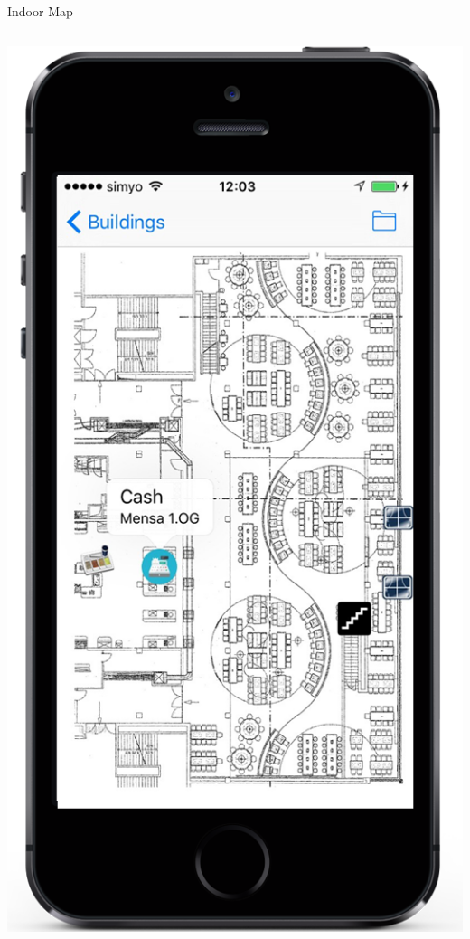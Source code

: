 \documentclass[11pt]{beamer}
\begin{document}
\begin{frame}{Indoor Map}
\begin{columns}[T]
\begin{column}{.4\textwidth}
    \includegraphics[scale=0.25]{mapmensainfo}
  \end{column}
\end{columns}

\end{frame}


\end{document}
